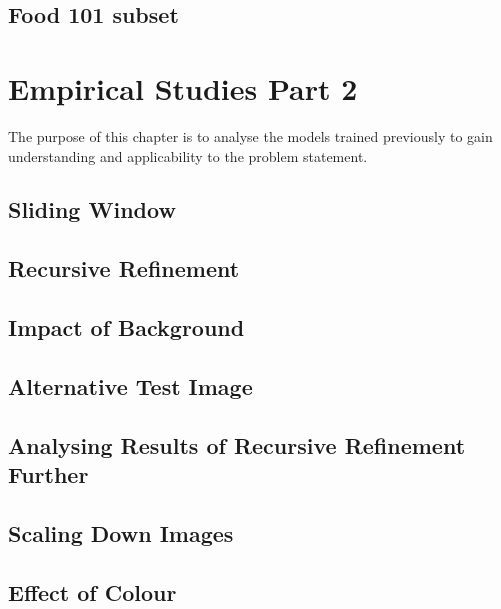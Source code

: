 \section{Food 101 subset}
\label{subset}


\chapter{Empirical Studies Part 2}
The purpose of this chapter is to analyse the models trained previously to gain understanding and applicability to the problem statement.

\section{Sliding Window}
\label{slidingWindow}


\section{Recursive Refinement}
\label{RR}


\section{Impact of Background}
\label{background}


\section{Alternative Test Image}
\label{alternative}


\section{Analysing Results of Recursive Refinement Further}
\label{rrAnalyse}


\section{Scaling Down Images}
\label{scale}


\section{Effect of Colour}
\label{colour}


% 

